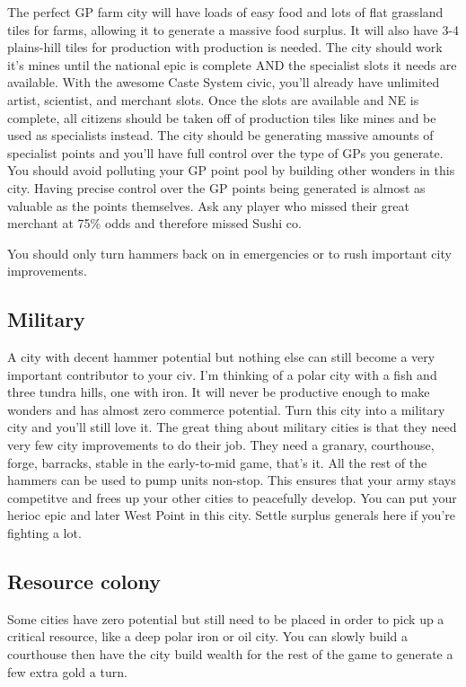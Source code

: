 \documentclass[10pt]{article}
\begin{document}
The perfect GP farm city will have loads of easy food and lots of flat
grassland tiles for farms, allowing it to generate a massive food
surplus. It will also have 3-4 plains-hill tiles for production with
production is needed. The city should work it's mines until the
national epic is complete AND the specialist slots it needs are
available. With the awesome Caste System civic, you'll already have
unlimited artist, scientist, and merchant slots. Once the slots are
available and NE is complete, all citizens should be taken off of
production tiles like mines and be used as specialists instead. The
city should be generating massive amounts of specialist points and
you'll have full control over the type of GPs you generate. You should
avoid polluting your GP point pool by building other wonders in this
city. Having precise control over the GP points being generated is
almost as valuable as the points themselves. Ask any player who missed
their great merchant at 75\% odds and therefore missed Sushi co.

You should only turn hammers back on in emergencies or to rush important city improvements.

\subsection*{Military}

A city with decent hammer potential but nothing else can still become
a very important contributor to your civ. I'm thinking of a polar city
with a fish and three tundra hills, one with iron. It will never be
productive enough to make wonders and has almost zero commerce
potential. Turn this city into a military city and you'll still love
it. The great thing about military cities is that they need very few
city improvements to do their job. They need a granary, courthouse,
forge, barracks, stable in the early-to-mid game, that's it. All the
rest of the hammers can be used to pump units non-stop.  This ensures
that your army stays competitve and frees up your other cities to
peacefully develop. You can put your herioc epic and later West Point
in this city. Settle surplus generals here if you're fighting a lot.

\subsection*{Resource colony}

Some cities have zero potential but still need to be placed in order
to pick up a critical resource, like a deep polar iron or oil
city. You can slowly build a courthouse then have the city build
wealth for the rest of the game to generate a few extra gold a turn.
\end{document}
